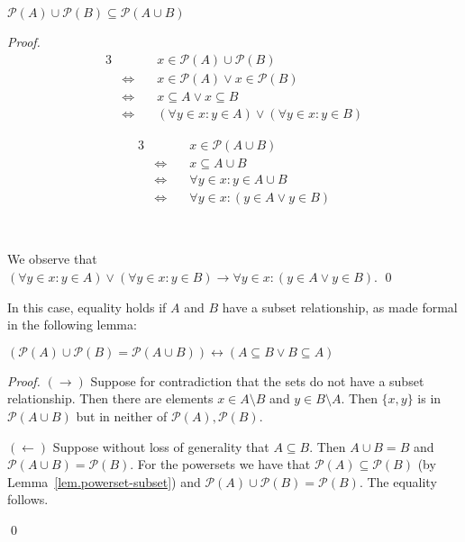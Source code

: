\documentclass[11pt]{llncs}
\begin{document}
\begin{lemma}
  $\mathcal{P}(A) \cup \mathcal{P}(B) \subseteq \mathcal{P}(A \cup B)$
\end{lemma}
\begin{proof}
  \begin{minipage}[t]{0.49\textwidth}
    \begin{alignat*}{3}
                           && x \in \mathcal{P}(A) \cup \mathcal{P}(B)\\
      &\Leftrightarrow\quad & x \in \mathcal{P}(A) \lor x \in \mathcal{P}(B)\\
      &\Leftrightarrow\quad & x \subseteq A \lor x \subseteq B\\
      &\Leftrightarrow\quad & (\forall y \in x: y \in A) \lor (\forall y \in x: y \in B)
    \end{alignat*}
  \end{minipage}
  \textwidth
  \vline
  \textwidth
  \begin{minipage}[t]{0.45\textwidth}
    \begin{alignat*}{3}
                           && x \in \mathcal{P}(A \cup B)\\
      &\Leftrightarrow\quad & x \subseteq A \cup B\\
      &\Leftrightarrow\quad & \forall y \in x: y \in A \cup B\\
      &\Leftrightarrow\quad & \forall y \in x: (y \in A \lor y \in B)
    \end{alignat*}
  \end{minipage}

  ~

  We observe that $(\forall y \in x: y \in A) \lor (\forall y \in x: y \in B)
  \rightarrow \forall y \in x: (y \in A \lor y \in B)$.
  \qed
\end{proof}

In this case, equality holds if $A$ and $B$ have a subset relationship, as made
formal in the following lemma:

\begin{lemma}
  $
  (\mathcal{P}(A) \cup \mathcal{P}(B) = \mathcal{P}(A \cup B))
  \leftrightarrow
  (A \subseteq B \lor B \subseteq A)
  $
\end{lemma}
\begin{proof}
  \item $(\rightarrow)$
  Suppose for contradiction that the sets do not have a subset relationship.
  Then there are elements $x \in A \setminus B$ and $y \in B \setminus A$.
  Then $\{x, y\}$ is in $\mathcal{P}(A \cup B)$ but in neither of
  $\mathcal{P}(A), \mathcal{P}(B)$.

  \item $(\leftarrow)$
  Suppose without loss of generality that $A \subseteq B$. Then $A \cup B = B$
  and $\mathcal{P}(A \cup B) = \mathcal{P}(B)$.
  For the powersets we have that $\mathcal{P}(A) \subseteq \mathcal{P}(B)$ (by
  Lemma~\ref{lem.powerset-subset}) and
  $\mathcal{P}(A) \cup \mathcal{P}(B) = \mathcal{P}(B)$. The equality follows.

  \qed
\end{proof}
\end{document}
